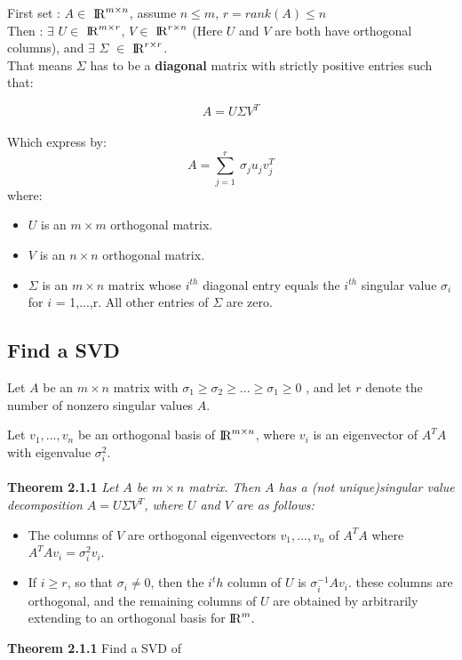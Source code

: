 \documentclass{article}
\begin{document}
First set :
$A \in$
${\rm I\!R}^{m \times n}$, assume $n \leq m$,
$r = rank(A) \leq n$
\\
Then : 
$\exists$
$U \in $
${\rm I\!R}^{m \times r}$,
$V \in$
${\rm I\!R}^{r \times n}$
(Here $U$ and $V$ are both have orthogonal columns), and
$\exists$
$\Sigma$
$\in$
${\rm I\!R}^{r \times r}$.
\\
That means
$\Sigma$
has to be a \textbf{diagonal} matrix with strictly positive entries such that:

\begin{equation}
	A = U \Sigma V^T
\end{equation}
\\
Which express by:
\begin{equation}
	A = \sum_{j=1}^{r} \ \sigma_j u_j v_j^T
\end{equation}
where:
\begin{itemize}
	\item $U$ is an $m \times m$ orthogonal matrix.
	\item $V$ is an $n \times n$ orthogonal matrix.
	\item $\Sigma$ is an $m \times n$ matrix whose $i^{th}$ diagonal entry equals the $i^{th}$ singular value $\sigma_i$ for $i$ = 1,...,r. All other entries of $\Sigma$ are zero.
\end{itemize}

\subsection{Find a SVD}
Let $A$ be an 
$m \times n$
matrix with 
$\sigma_1 \geq \sigma_2 \geq ... \geq \sigma_1 \geq 0$
, and let
$r$
denote the number of nonzero singular values
$A$.
\vspace{1mm}

Let 
$v_1,...,v_n$
be an orthogonal basis of
${\rm I\!R}^{m \times n}$,
where
$v_i$
is an eigenvector of 
$A^TA$
with eigenvalue
$\sigma^2_i$.
\\~\\
\textbf{Theorem 2.1.1}
\textit{Let $A$ be $m \times n$ matrix. Then $A$ has a (not unique)singular value decomposition $A = U \Sigma V^T$, where  $U$ and $V$ are as follows:}
\begin{itemize}
	\item The columns of $V$ are orthogonal eigenvectors $v_1, ... , v_n$ of $A^TA$ where $A^TAv_i= \sigma_i^2 v_i$.
	\item If $i \geq r$, so that $\sigma_i \not= 0$, then the $i^th$ column of $U$ is $\sigma_i^{-1} Av_i $. these columns are orthogonal, and the remaining columns of $U$ are obtained by arbitrarily extending to an orthogonal basis for ${\rm I\!R}^{m}.$
\end{itemize}
\textbf{Theorem 2.1.1} Find a SVD of 
\end{document}
